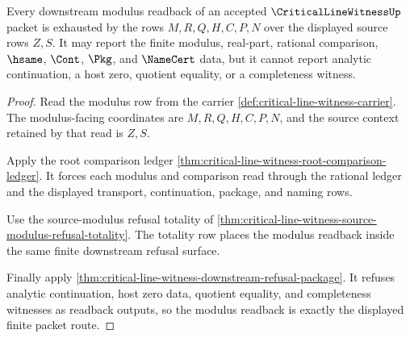 \begin{theorem}
\label{thm:critical-line-witness-modulus-refusal-readback}
Every downstream modulus readback of an accepted $\CriticalLineWitnessUp$ packet is exhausted by the rows $M,R,Q,H,C,P,N$ over the displayed source rows $Z,S$. It may report the finite modulus, real-part, rational comparison, $\hsame$, $\Cont$, $\Pkg$, and $\NameCert$ data, but it cannot report analytic continuation, a host zero, quotient equality, or a completeness witness.
\end{theorem}
\begin{proof}
Read the modulus row from the carrier \autoref{def:critical-line-witness-carrier}. The modulus-facing coordinates are $M,R,Q,H,C,P,N$, and the source context retained by that read is $Z,S$.

Apply the root comparison ledger \autoref{thm:critical-line-witness-root-comparison-ledger}. It forces each modulus and comparison read through the rational ledger and the displayed transport, continuation, package, and naming rows.

Use the source-modulus refusal totality of \autoref{thm:critical-line-witness-source-modulus-refusal-totality}. The totality row places the modulus readback inside the same finite downstream refusal surface.

Finally apply \autoref{thm:critical-line-witness-downstream-refusal-package}. It refuses analytic continuation, host zero data, quotient equality, and completeness witnesses as readback outputs, so the modulus readback is exactly the displayed finite packet route.
\end{proof}
